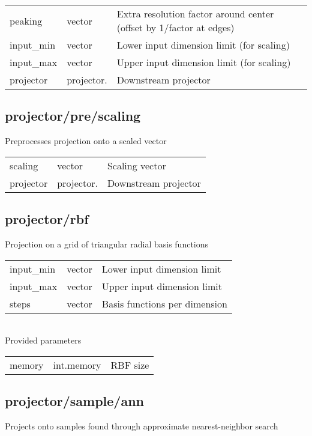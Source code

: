 \noindent\begin{tabular}{@{}lll@{}}
peaking&vector&Extra resolution factor around center (offset by 1/factor at edges)\\
input\_min&vector&Lower input dimension limit (for scaling)\\
input\_max&vector&Upper input dimension limit (for scaling)\\
projector&projector.&Downstream projector\\
\end{tabular}
\subsection{projector/pre/scaling}
\noindent Preprocesses projection onto a scaled vector\\

\noindent\begin{tabular}{@{}lll@{}}
scaling&vector&Scaling vector\\
projector&projector.&Downstream projector\\
\end{tabular}
\subsection{projector/rbf}
\noindent Projection on a grid of triangular radial basis functions\\

\noindent\begin{tabular}{@{}lll@{}}
input\_min&vector&Lower input dimension limit\\
input\_max&vector&Upper input dimension limit\\
steps&vector&Basis functions per dimension\\
\end{tabular}
\\

\noindent Provided parameters\\

\noindent\begin{tabular}{@{}lll@{}}
memory&int.memory&RBF size\\
\end{tabular}
\subsection{projector/sample/ann}
\noindent Projects onto samples found through approximate nearest-neighbor search\\

